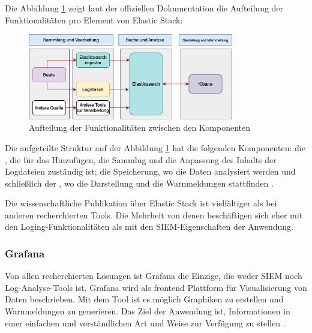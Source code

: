 Die Abbildung \ref{fig:ElasticKomponenten} zeigt laut der offiziellen Dokumentation die Aufteilung der Funktionalitäten pro Element von Elastic Stack:

\begin{figure}[H]
   \centering
   \includegraphics[width=0.8\textwidth]{assets/ELK_Architektur.png}
   \caption[Aufteilung der Funktionalitäten zwischen den Komponenten]
   {Aufteilung der Funktionalitäten zwischen den Komponenten}
   \label{fig:ElasticKomponenten}
   \centering
\end{figure}

Die aufgeteilte Struktur auf der Abbildung \ref{fig:ElasticKomponenten} hat die folgenden Komponenten: die , die für das Hinzufügen, die Sammlug und die Anpassung des Inhalts der Logdateien zuständig ist; die Speicherung, wo die Daten analysiert werden und schließlich der , wo die Darstellung und die Warnmeldungen stattfinden \citep{elastic_docs}.


Die wissenschaftliche Publikation über Elastic Stack ist vielfältiger als bei anderen recherchierten Tools. Die Mehrheit von denen beschäftigen sich eher mit den Loging-Funktionalitäten als mit den \gls{SIEM}-Eigenschaften der Anwendung.

\subsubsection{Grafana}
Von allen recherchierten Lösungen ist Grafana die Einzige, die weder \gls{SIEM} noch Log-Analyse-Tools ist. Grafana wird als \gls{frontend} Plattform für Visualisierung von Daten beschrieben. Mit dem Tool ist es möglich Graphiken zu erstellen und Warnmeldungen zu generieren. Das Ziel der Anwendung ist, Informationen in einer einfachen und verständlichen Art und Weise zur Verfügung zu stellen \citep{redhat_grafana}.

